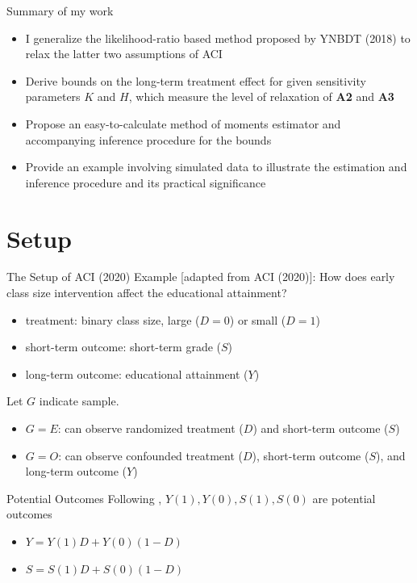 \documentclass{beamer}					%
\begin{document}
\begin{frame}{Summary of my work}
    \begin{itemize}
        \item I generalize the likelihood-ratio based method proposed by YNBDT (2018) to relax the latter two assumptions of ACI
        \item Derive bounds on the long-term treatment effect for given sensitivity parameters $K$ and $H$, which measure the level of relaxation of {\color{red}\textbf{A2}} and {\color{red}\textbf{A3}} 
        \item Propose an easy-to-calculate method of moments estimator and accompanying inference procedure for the bounds
        \item Provide an example involving simulated data to illustrate the estimation and inference procedure and its practical significance
    \end{itemize}
\end{frame}

\section{Setup}

\begin{frame}{The Setup of ACI (2020)}
    Example [adapted from ACI (2020)]: {\color{orange} How does early class size intervention affect the educational attainment?}
    \begin{itemize}
        \item treatment: binary class size, large ($D = 0$) or small ($D = 1$)
        \item short-term outcome: short-term grade ($S$)
        \item long-term outcome: educational attainment ($Y$)
    \end{itemize}
    Let $G$ indicate sample.
    \begin{itemize}
        \item $G = E$: can observe randomized treatment ($D$) and short-term outcome ($S$) 
        \item $G = O$: can observe confounded treatment ($D$), short-term outcome ($S$), and long-term outcome ($Y$)
    \end{itemize}
    
\end{frame}

\begin{frame}{Potential Outcomes}
    Following \textcite{rubin1974estimating}, $Y(1), Y(0), S(1), S(0)$ are potential outcomes
    \begin{itemize}
        \item $Y = Y(1)D + Y(0)(1-D)$ 
        \item $S = S(1)D + S(0)(1 - D)$
    \end{itemize}
\end{frame}
\end{document}

